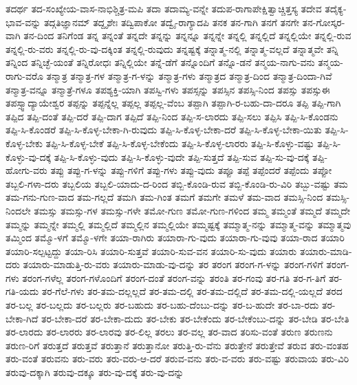 {ತದರ್ಥ
ತದ-ಸಂಖ್ಯೇಯ-ವಾಸ-ನಾಭಿಶ್ಚಿತ್ರ-ಮಪಿ
ತದಾ
ತದಾಮ್ಯ-ವನ್ನೇ
ತದುಪ-ರಾಗಾಪೇಕ್ಷಿತ್ವಾಚ್ಚಿತ್ತಸ್ಯ
ತದೇವ
ತದೈಕ್ಯ-ಭಾವ-ವನ್ನು
ತದ್ಗತಿಜ್ಞಾನಮ್
ತದ್ದೃಶೇಃ
ತದ್ವಿಪಾಕೋ
ತದ್ವೈ-ರಾಗ್ಯಾದಪಿ
ತನಕ
ತನ-ಗಾಗಿ
ತನಗೆ
ತನಗೇ
ತನ-ಗೋಸ್ಕರ-ವಾಗಿ
ತನ-ದಿಂದ
ತನಿಗೆಂಡ
ತನ್ನ
ತನ್ನಂತೆ
ತನ್ನದೇ
ತನ್ನನ್ನು
ತನ್ನನ್ನೂ
ತನ್ನನ್ನೇ
ತನ್ನಲ್ಲಿ
ತನ್ನಲ್ಲಿದೆ
ತನ್ನಲ್ಲಿಯೇ
ತನ್ನಲ್ಲಿ-ರುವ
ತನ್ನಲ್ಲಿ-ರು-ವರು
ತನ್ನಲ್ಲಿ-ರು-ವು-ದಕ್ಕಿಂತ
ತನ್ನಲ್ಲಿ-ರುವುದು
ತನ್ನಷ್ಟಕ್ಕೆ
ತನ್ನಾತ್ಮ-ನಲ್ಲಿ
ತನ್ನಾತ್ಮ-ವಲ್ಲದೆ
ತನ್ನಾತ್ಮವೇ
ತನ್ನಿ
ತನ್ನಿಂದ
ತನ್ನಿಚ್ಛೆ-ಯಂತೆ
ತನ್ನಿರೋಧಃ
ತನ್ನಿಲ್ಲಿಯೇ
ತನ್ನೆ-ಡೆಗೆ
ತನ್ನೊಂದಿಗೆ
ತನ್ನೊ-ಡನೆ
ತನ್ಮಯ-ನಾಗು-ವನು
ತನ್ಮಯ-ರಾಗು-ವರೊ
ತನ್ಮಾತ್ರ
ತನ್ಮಾತ್ರ-ಗಳ
ತನ್ಮಾತ್ರ-ಗ-ಳನ್ನು
ತನ್ಮಾತ್ರ-ಗಳು
ತನ್ಮಾತ್ರದ
ತನ್ಮಾತ್ರ-ದಿಂದ
ತನ್ಮಾತ್ರ-ದಿಂದಾ-ಗಿವೆ
ತನ್ಮಾತ್ರ-ವನ್ನೂ
ತನ್ಮಾತ್ರೆ-ಗಳೂ
ತಪಶ್ಯಕ್ತಿ-ಯಾಗಿ
ತಪಸ್ವಿ-ಗಳು
ತಪಸ್ಸನ್ನು
ತಪಸ್ಸಿನ
ತಪಸ್ಸಿ-ನಿಂದ
ತಪಸ್ಸು
ತಪಸ್ಸುಈ
ತಪಸ್ಸ್ವಾದ್ಯಾಯೇಶ್ವರ
ತಪ್ಪನ್ನು
ತಪ್ಪನ್ನೆಲ್ಲ
ತಪ್ಪಲ್ಲ
ತಪ್ಪಲ್ಲ-ವೆಂಬ
ತಪ್ಪಾಗಿ
ತಪ್ಪಾಗಿ-ರ-ಬಹು-ದಾ-ದರೂ
ತಪ್ಪಿ
ತಪ್ಪಿ-ಗಾಗಿ
ತಪ್ಪಿದ
ತಪ್ಪಿ-ದಂತೆ
ತಪ್ಪಿ-ದರೆ
ತಪ್ಪಿ-ದಾಗ
ತಪ್ಪಿದೆ
ತಪ್ಪಿ-ನಿಂದ
ತಪ್ಪಿ-ಸ-ಲಾರದು
ತಪ್ಪಿ-ಸಲು
ತಪ್ಪಿಸಿ
ತಪ್ಪಿ-ಸಿ-ಕೊಂಡನು
ತಪ್ಪಿ-ಸಿ-ಕೊಂಡರೆ
ತಪ್ಪಿ-ಸಿ-ಕೊಳ್ಳ-ಬೇಕಾ-ಗಿ-ರುವುದು
ತಪ್ಪಿ-ಸಿ-ಕೊಳ್ಳ-ಬೇಕಾ-ದರೆ
ತಪ್ಪಿ-ಸಿ-ಕೊಳ್ಳ-ಬೇಕಾ-ಯಿತು
ತಪ್ಪಿ-ಸಿ-ಕೊಳ್ಳ-ಬೇಕು
ತಪ್ಪಿ-ಸಿ-ಕೊಳ್ಳ-ಬೇಕೆ
ತಪ್ಪಿ-ಸಿ-ಕೊಳ್ಳ-ಬೇಕೆಂದು
ತಪ್ಪಿ-ಸಿ-ಕೊಳ್ಳ-ಲಾರರು
ತಪ್ಪಿ-ಸಿ-ಕೊಳ್ಳು-ವಷ್ಟು
ತಪ್ಪಿ-ಸಿ-ಕೊಳ್ಳು-ವು-ದಕ್ಕೆ
ತಪ್ಪಿ-ಸಿ-ಕೊಳ್ಳು-ವುದು
ತಪ್ಪಿ-ಸಿ-ಕೊಳ್ಳು-ವುದೇ
ತಪ್ಪಿ-ಸುತ್ತದೆ
ತಪ್ಪಿ-ಸುವ
ತಪ್ಪಿ-ಸು-ವು-ದಕ್ಕೆ
ತಪ್ಪಿ-ಹೋಗು-ವರು
ತಪ್ಪು
ತಪ್ಪು-ಗ-ಳನ್ನು
ತಪ್ಪು-ಗಳಿಗೆ
ತಪ್ಪು-ಗಳು
ತಪ್ಪು-ವುದು
ತಪ್ಪೂ
ತಪ್ಪೆ
ತಪ್ಪೆಂದರೆ
ತಪ್ಪೆಂದು
ತಪ್ಪೋ
ತಬ್ಬಲಿ-ಗಳಾ-ದರು
ತಬ್ಬಲಿಯ
ತಬ್ಬಲಿ-ಯಾದು-ದ-ರಿಂದ
ತಬ್ಬಿ-ಕೊಂಡಿ-ರುವ
ತಬ್ಬಿ-ಕೊಂಡಿ-ರು-ವಿರಿ
ತಬ್ಬು-ವಷ್ಟು
ತಮ
ತಮ-ಗನು-ಗುಣ-ವಾದ
ತಮ-ಗಲ್ಲದೆ
ತಮಗಿ
ತಮ-ಗಿಂತ
ತಮಗೆ
ತಮಗೇ
ತಮಳೆ
ತಮ-ವಾದ
ತಮಸ್ಸಿ-ನಿಂದ
ತಮಸ್ಸಿ-ನಿಂದಲೇ
ತಮಸ್ಸು
ತಮಸ್ಸು-ಗಳ
ತಮಸ್ಸು-ಗಳೇ
ತಮೋ-ಗುಣ
ತಮೋ-ಗುಣ-ಗಳಿಂದ
ತಮ್ಮ
ತಮ್ಮಂತೆ
ತಮ್ಮದೆ
ತಮ್ಮದೇ
ತಮ್ಮನ್ನು
ತಮ್ಮನ್ನೇ
ತಮ್ಮಲ್ಲಿ
ತಮ್ಮಲ್ಲಿದೆ
ತಮ್ಮಲ್ಲಿನ
ತಮ್ಮಲ್ಲಿಯೇ
ತಮ್ಮಷ್ಟಕ್ಕೆ
ತಮ್ಮಾತ್ಮ-ನನ್ನು
ತಮ್ಮಾತ್ಮ-ವನ್ನು
ತಮ್ಮಾತ್ಮವು
ತಮ್ಮಿಂದ
ತಮ್ಮೊ-ಳಗೆ
ತಮ್ಮೊ-ಳಗೇ
ತಯಾ-ರಾಗಿರು
ತಯಾರಾ-ಗು-ವುದು
ತಯಾರಾ-ಗು-ವುವು
ತಯಾ-ರಾದ
ತಯಾರಿ
ತಯಾರಿ-ಸಲ್ಪಟ್ಟದ್ದು
ತಯಾ-ರಿಸಿ
ತಯಾರಿ-ಸುತ್ತವೆ
ತಯಾರಿ-ಸುವ-ವನ
ತಯಾರಿ-ಸು-ವುದು
ತಯಾರು
ತಯಾರು-ಮಾಡಿ-ದರು
ತಯಾರು-ಮಾಡುತ್ತಿ-ರು-ವರು
ತಯಾರು-ಮಾಡು-ವು-ದನ್ನು
ತರ
ತರಂಗ
ತರಂಗ-ಗ-ಳನ್ನು
ತರಂಗ-ಗಳಿಗೆ
ತರಂಗ-ಗಳು
ತರಂಗ-ಗಳೆಲ್ಲ
ತರಂಗ-ಗಳೊಂದಿಗೆ
ತರಂಗ-ದಂತೆ
ತರಂಗ-ವನ್ನು
ತರಂತಿ
ತರ-ಗಂವು
ತರ-ಗತಿ
ತರ-ಗ-ತಿಗೆ
ತರ-ಗತಿ-ಯದು
ತರ-ಗೆಲೆ-ಗಳು
ತರ-ತಮ-ದಲ್ಲಲ್ಲದೆ
ತರ-ತಮ-ದಲ್ಲಿ
ತರ-ತಮ-ದಲ್ಲಿದೆ
ತರ-ತಮ-ದಲ್ಲಿ-ಯಲ್ಲದೆ
ತರದ
ತರ-ಬಲ್ಲ
ತರ-ಬಲ್ಲದು
ತರ-ಬಲ್ಲರು
ತರ-ಬಹುದು
ತರ-ಬಹು-ದೆಂಬು-ದನ್ನು
ತರ-ಬ-ಹುದೇ
ತರ-ಬಾ-ರದು
ತರ-ಬೇಕಾ-ಗಿದೆ
ತರ-ಬೇಕಾ-ದರೆ
ತರ-ಬೇಕಾ-ದುದು
ತರ-ಬೇಕು
ತರ-ಬೇಕೆಂದು
ತರ-ಬೇಕೆಂಬು-ದನ್ನು
ತರ-ಬೇಡಿ
ತರ-ಬೇತಿ
ತರ-ಲಾರದು
ತರ-ಲಾರರು
ತರ-ಲಾರವು
ತರ-ಲಿಲ್ಲ
ತರಲು
ತರ-ವಲ್ಲ
ತರ-ವಾದ
ತರಿಸು-ವಂತೆ
ತರುಣ
ತರುಣನು
ತರುಣ-ರಿಗೆ
ತರುತ್ತದೆ
ತರುತ್ತವೆ
ತರುತ್ತಾನೆ
ತರುತ್ತಾನೋ
ತರುತ್ತಿ-ರು-ವೆನು
ತರುತ್ತೇನೆ
ತರುತ್ತೇವೆ
ತರುವ
ತರು-ವಂತಹ
ತರು-ವಂತೆ
ತರುವನು
ತರು-ವರು
ತರು-ವರು-ಆ-ದರೆ
ತರುವ-ವನು
ತರು-ವ-ವರು
ತರು-ವಷ್ಟು
ತರುವಾಯ
ತರು-ವಿರಿ
ತರುವು-ದಕ್ಕಾಗಿ
ತರುವು-ದಕ್ಕೂ
ತರು-ವು-ದಕ್ಕೆ
ತರು-ವು-ದನ್ನು
}
